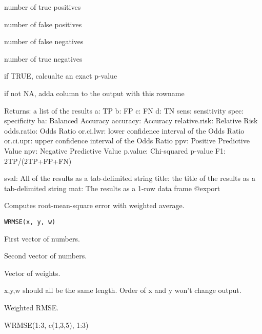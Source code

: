 \documentclass[letterpaper]{book}
\begin{document}
\begin{Arguments}
\begin{ldescription}
\item[\code{tp}] number of true positives

\item[\code{fp}] number of false positives

\item[\code{fn}] number of false negatives

\item[\code{tn}] number of true negatives

\item[\code{do.p}] if TRUE, calcualte an exact p-value

\item[\code{rowname}] if not NA, adda column to the output with this rowname

Returns:
a list of the results
a: TP
b: FP
c: FN
d: TN
sens: sensitivity
spec: specificity
ba: Balanced Accuracy
accuracy: Accuracy
relative.risk: Relative Risk
odds.ratio: Odds Ratio
or.ci.lwr: lower confidence interval of the Odds Ratio
or.ci.upr: upper confidence interval of the Odds Ratio
ppv: Positive Predictive Value
npv: Negative Predictive Value
p.value: Chi-squared p-value
F1: 2TP/(2TP+FP+FN)

sval: All of the results as a tab-delimited string
title: the title of the results as a tab-delimited string
mat: The results as a 1-row data frame
@export
\end{ldescription}
\end{Arguments}
%
\begin{Description}\relax
Computes root-mean-square error with weighted average.
\end{Description}
%
\begin{Usage}
\begin{verbatim}
WRMSE(x, y, w)
\end{verbatim}
\end{Usage}
%
\begin{Arguments}
\begin{ldescription}
\item[\code{x}] First vector of numbers.

\item[\code{y}] Second vector of numbers.

\item[\code{w}] Vector of weights.
\end{ldescription}
\end{Arguments}
%
\begin{Details}\relax
x,y,w should all be the same length. Order of x and y won't change output.
\end{Details}
%
\begin{Value}
Weighted RMSE.
\end{Value}
%
\begin{Examples}
\begin{ExampleCode}
WRMSE(1:3, c(1,3,5), 1:3)
\end{ExampleCode}
\end{Examples}
\printindex{}
\end{document}
